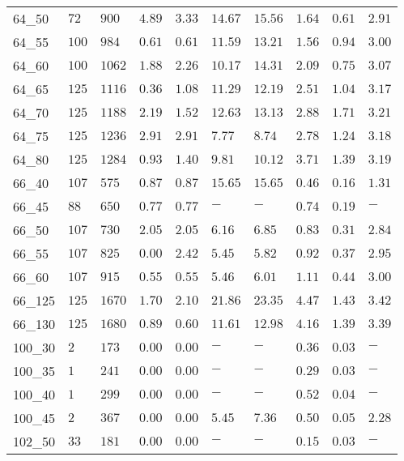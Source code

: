 \begin{center}
\begin{table}[]
\begin{adjustwidth}{-0.4in}{-1in}
\begin{tabular}{|lll|l|l|ll|lll|}
64\_50  & $72   $ & $900 $ & $4.89$ & $3.33$   & $14.67$ & $15.56$ & $1.64$ & $0.61$   & $2.91$ \\
64\_55  & $100  $ & $984 $ & $0.61$ & $0.61$   & $11.59$ & $13.21$ & $1.56$ & $0.94$   & $3.00$ \\
64\_60  & $100  $ & $1062$ & $1.88$ & $2.26$   & $10.17$ & $14.31$ & $2.09$ & $0.75$   & $3.07$ \\
64\_65  & $125  $ & $1116$ & $0.36$ & $1.08$   & $11.29$ & $12.19$ & $2.51$ & $1.04$   & $3.17$ \\
64\_70  & $125  $ & $1188$ & $2.19$ & $1.52$   & $12.63$ & $13.13$ & $2.88$ & $1.71$   & $3.21$ \\
64\_75  & $125  $ & $1236$ & $2.91$ & $2.91$   & $7.77$  & $8.74$  & $2.78$ & $1.24$   & $3.18$ \\
64\_80  & $125  $ & $1284$ & $0.93$ & $1.40$   & $9.81$  & $10.12$ & $3.71$ & $1.39$   & $3.19$ \\
\hline
66\_40  & $107  $ & $575 $ & $0.87$ & $0.87$   & $15.65$ & $15.65$ & $0.46$ & $0.16$   & $1.31$ \\
66\_45  & $88   $ & $650 $ & $0.77$ & $0.77$   & $-$     & $-$     & $0.74$ & $0.19$   & $-   $ \\
66\_50  & $107  $ & $730 $ & $2.05$ & $2.05$   & $6.16$  & $6.85$  & $0.83$ & $0.31$   & $2.84$ \\
66\_55  & $107  $ & $825 $ & $\bm{0.00}$ & $2.42$   & $5.45$  & $5.82$  & $0.92$ & $0.37$   & $2.95$ \\
66\_60  & $107  $ & $915 $ & $0.55$ & $0.55$   & $5.46$  & $6.01$  & $1.11$ & $0.44$   & $3.00$ \\
66\_125 & $125  $ & $1670$ & $1.70$ & $2.10$   & $21.86$ & $23.35$ & $4.47$ & $1.43$   & $3.42$ \\
66\_130 & $125  $ & $1680$ & $0.89$ & $0.60$   & $11.61$ & $12.98$ & $4.16$ & $1.39$   & $3.39$ \\
\hline
100\_30 & $2    $ & $173 $ & $\bm{0.00}$ & $\bm{0.00}$   & $-$     & $-$     & $0.36$ & $0.03$   & $-   $ \\
100\_35 & $1    $ & $241 $ & $\bm{0.00}$ & $\bm{0.00}$   & $-$     & $-$     & $0.29$ & $0.03$   & $-   $ \\
100\_40 & $1    $ & $299 $ & $\bm{0.00}$ & $\bm{0.00}$   & $-$     & $-$     & $0.52$ & $0.04$   & $-   $ \\
100\_45 & $2    $ & $367 $ & $\bm{0.00}$ & $\bm{0.00}$   & $5.45$  & $7.36$  & $0.50$ & $0.05$   & $2.28$ \\
\hline
102\_50 & $33   $ & $181 $ & $\bm{0.00}$ & $\bm{0.00}$   & $-$     & $-$     & $0.15$ & $0.03$   & $-   $ \\

\end{tabular}
\end{adjustwidth}
\end{table}
\end{center}

